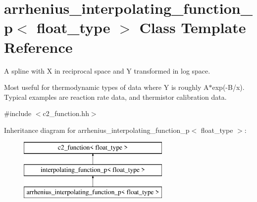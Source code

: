 \hypertarget{classarrhenius__interpolating__function__p}{\section{arrhenius\-\_\-interpolating\-\_\-function\-\_\-p$<$ float\-\_\-type $>$ Class Template Reference}
\label{classarrhenius__interpolating__function__p}
}


A spline with X in reciprocal space and Y transformed in log space.

Most useful for thermodynamic types of data where Y is roughly A$\ast$exp(-\/\-B/x). Typical examples are reaction rate data, and thermistor calibration data.  




{\ttfamily \#include $<$c2\-\_\-function.\-hh$>$}

Inheritance diagram for arrhenius\-\_\-interpolating\-\_\-function\-\_\-p$<$ float\-\_\-type $>$\-:\begin{figure}[H]
\begin{center}
\leavevmode
\includegraphics[height=3.000000cm]{classarrhenius__interpolating__function__p}
\end{center}
\end{figure}

